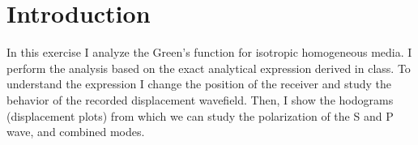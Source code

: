 \section{Introduction}
In this exercise I analyze the Green's function for isotropic homogeneous media. I perform
the analysis based on the exact analytical expression derived in class. To understand the
expression I change the position of the receiver and study the behavior of the recorded displacement wavefield.
Then, I show the hodograms (displacement plots) from which we can study the polarization of the 
S and P wave, and combined modes. 